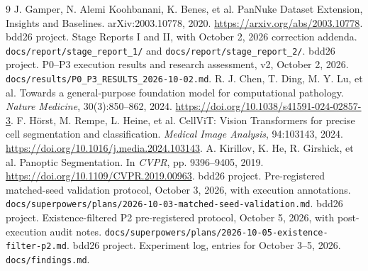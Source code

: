 \documentclass[11pt,a4paper]{article}
\newcommand{\code}[1]{\nolinkurl{#1}}
\begin{document}
\begin{thebibliography}{9}
 J. Gamper, N. Alemi Koohbanani, K. Benes, et al. PanNuke Dataset Extension, Insights and Baselines. arXiv:2003.10778, 2020. \url{https://arxiv.org/abs/2003.10778}.
 bdd26 project. Stage Reports I and II, with October 2, 2026 correction addenda. \code{docs/report/stage_report_1/} and \code{docs/report/stage_report_2/}.
 bdd26 project. P0--P3 execution results and research assessment, v2, October 2, 2026. \code{docs/results/P0_P3_RESULTS_2026-10-02.md}.
 R. J. Chen, T. Ding, M. Y. Lu, et al. Towards a general-purpose foundation model for computational pathology. \emph{Nature Medicine}, 30(3):850--862, 2024. \url{https://doi.org/10.1038/s41591-024-02857-3}.
 F. H\"orst, M. Rempe, L. Heine, et al. CellViT: Vision Transformers for precise cell segmentation and classification. \emph{Medical Image Analysis}, 94:103143, 2024. \url{https://doi.org/10.1016/j.media.2024.103143}.
 A. Kirillov, K. He, R. Girshick, et al. Panoptic Segmentation. In \emph{CVPR}, pp. 9396--9405, 2019. \url{https://doi.org/10.1109/CVPR.2019.00963}.
 bdd26 project. Pre-registered matched-seed validation protocol, October 3, 2026, with execution annotations. \code{docs/superpowers/plans/2026-10-03-matched-seed-validation.md}.
 bdd26 project. Existence-filtered P2 pre-registered protocol, October 5, 2026, with post-execution audit notes. \code{docs/superpowers/plans/2026-10-05-existence-filter-p2.md}.
 bdd26 project. Experiment log, entries for October 3--5, 2026. \code{docs/findings.md}.
\end{thebibliography}
\end{document}
